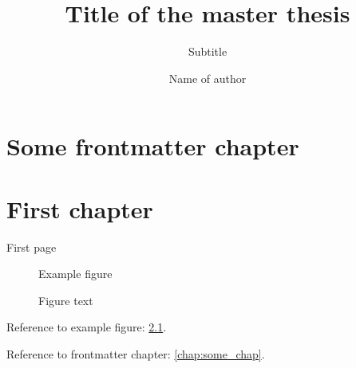 \documentclass{uit-thesis-test}
\begin{document}
\title{Title of the master thesis}
\subtitle{Subtitle}
\author{Name of author}

\maketitle

\frontmatter

\chapter{Some frontmatter chapter}\label{chap:some_chap}

\tableofcontents

\mainmatter

\chapter{First chapter}

First page

\begin{figure}[h]
\centering
Example figure
\caption{Figure text}\label{fig:example}
\end{figure}

\newpage

Reference to example figure: \ref{fig:example}.

Reference to frontmatter chapter: \autoref{chap:some_chap}.
\end{document}
